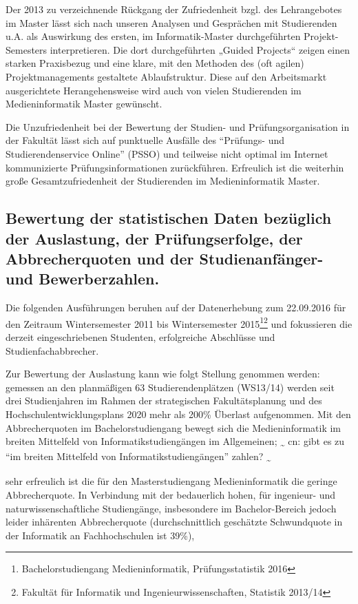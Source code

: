 Der 2013 zu verzeichnende Rückgang der Zufriedenheit bzgl. des
Lehrangebotes im Master lässt sich nach unseren Analysen und Gesprächen
mit Studierenden u.A. als Auswirkung des ersten, im Informatik-Master
durchgeführten Projekt-Semesters interpretieren. Die dort durchgeführten
„Guided Projects`` zeigen einen starken Praxisbezug und eine klare, mit
den Methoden des (oft agilen) Projektmanagements gestaltete
Ablaufstruktur. Diese auf den Arbeitsmarkt ausgerichtete
Herangehensweise wird auch von vielen Studierenden im Medieninformatik
Master gewünscht.

Die Unzufriedenheit bei der Bewertung der Studien- und
Prüfungsorganisation in der Fakultät lässt sich auf punktuelle Ausfälle
des ``Prüfungs- und Studierendenservice Online'' (PSSO) und teilweise
nicht optimal im Internet kommunizierte Prüfungsinformationen
zurückführen. Erfreulich ist die weiterhin große Gesamtzufriedenheit der
Studierenden im Medieninformatik Master.

\subsection{Bewertung der statistischen Daten bezüglich der
Auslastung, der Prüfungserfolge, der Abbrecherquoten und der
Studienanfänger- und
Bewerberzahlen.}\label{bewertung-der-statistischen-daten-bezuxfcglich-der-auslastung-der-pruxfcfungserfolge-der-abbrecherquoten-und-der-studienanfuxe4nger--und-bewerberzahlen.}

Die folgenden Ausführungen beruhen auf der Datenerhebung zum 22.09.2016
für den Zeitraum Wintersemester 2011 bis Wintersemester 2015\footnote{Bachelorstudiengang
  Medieninformatik, Prüfungsstatistik 2016}\footnote{Fakultät für
  Informatik und Ingenieurwissenschaften, Statistik 2013/14} und
fokussieren die derzeit eingeschriebenen Studenten, erfolgreiche
Abschlüsse und Studienfachabbrecher.

Zur Bewertung der Auslastung kann wie folgt Stellung genommen werden:
gemessen an den planmäßigen 63 Studierendenplätzen (WS13/14) werden seit
drei Studienjahren im Rahmen der strategischen Fakultätsplanung und des
Hochschulentwicklungsplans 2020 mehr als 200\% Überlast aufgenommen. Mit
den Abbrecherquoten im Bachelorstudiengang bewegt sich die
Medieninformatik im breiten Mittelfeld von Informatikstudiengängen im
Allgemeinen; \textsubscript{\textasciitilde{}} cn: gibt es zu ``im
breiten Mittelfeld von Informatikstudiengängen'' zahlen?
\textsubscript{\textasciitilde{}}

sehr erfreulich ist die für den Masterstudiengang Medieninformatik die
geringe Abbrecherquote. In Verbindung mit der bedauerlich hohen, für
ingenieur- und naturwissenschaftliche Studiengänge, insbesondere im
Bachelor-Bereich jedoch leider inhärenten Abbrecherquote
(durchschnittlich geschätzte Schwundquote in der Informatik an
Fachhochschulen ist 39\%),


